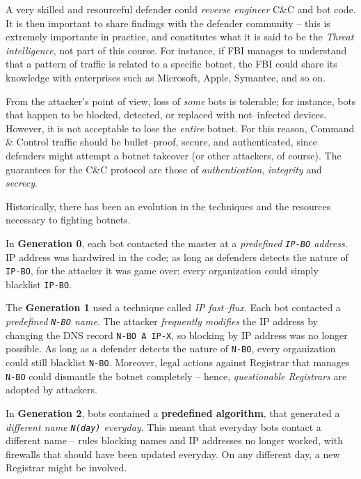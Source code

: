 \documentclass[10pt]{extbook}
\begin{document}
A very skilled and resourceful defender could \emph{reverse engineer} C\&C and
bot code. It is then important to share findings with the defender community --
this is extremely importante in practice, and constitutes what it is said to be
the \emph{Threat intelligence}, not part of this course. For instance, if FBI
manages to understand that a pattern of traffic is related to a specific
botnet, the FBI could share its knowledge with enterprises such as Microsoft,
Apple, Symantec, and so on.

From the attacker's point of view, loss of \emph{some} bots is tolerable; for
instance, bots that happen to be blocked, detected, or replaced with
not--infected devices. However, it is not acceptable to lose the \emph{entire}
botnet. For this reason, Command \& Control traffic should be bullet--proof,
secure, and authenticated, since defenders might attempt a botnet takeover (or
other attackers, of course). The guarantees for the C\&C protocol are those of
\emph{authentication}, \emph{integrity} and \emph{secrecy}.

Historically, there has been an evolution in the techniques and the resources
necessary to fighting botnets.

In \textbf{Generation 0}, each bot contacted the master at a \emph{predefined
\texttt{IP-BO} address}. IP address was hardwired in the code; as long as
defenders detects the nature of \texttt{IP-BO}, for the attacker it was game
over: every organization could simply blacklist \texttt{IP-BO}.

The \textbf{Generation 1} used a technique called \emph{IP fast--flux}. Each
bot contacted a \emph{predefined \texttt{N-BO} name}. The attacker
\emph{frequently modifies} the IP address by changing the DNS record
\texttt{N-BO A IP-X}, so blocking by IP address was no longer possible. As long
as a defender detects the nature of \texttt{N-BO}, every organization could
still blacklist \texttt{N-BO}. Moreover, legal actions against Registrar that
manages \texttt{N-BO} could dismantle the botnet completely -- hence,
\emph{questionable Registrars} are adopted by attackers.

In \textbf{Generation 2}, bots contained a \textbf{predefined algorithm}, that
generated a \emph{different name \texttt{N(day)} everyday}. This meant that
everyday bots contact a different name -- rules blocking names and IP addresses
no longer worked, with firewalls that should have been updated everyday. On any
different day, a new Registrar might be involved.
\end{document}
